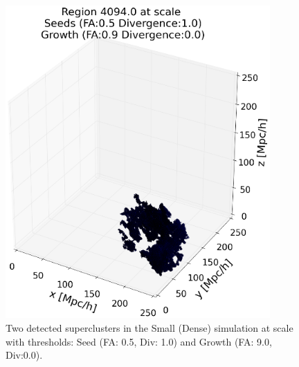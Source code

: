 \documentclass[12pt]{article}
\begin{document}
\begin{figure}[ht]
\begin{minipage}{.5\textwidth}
  \includegraphics[width=0.9\textwidth]{groups/3d/seeds_FA_5/region_4094_scale_seeds_FA_05_Trace_10_search_FA_09_Trace_00_.png}
\end{minipage}
\label{fg:detected_scale_51_90}
\caption{Two detected superclusters in the Small (Dense) simulation at scale with thresholds: Seed (FA: 0.5, Div: 1.0) and Growth (FA: 9.0, Div:0.0). }
\end{figure}
\FloatBarrier
\end{document}
